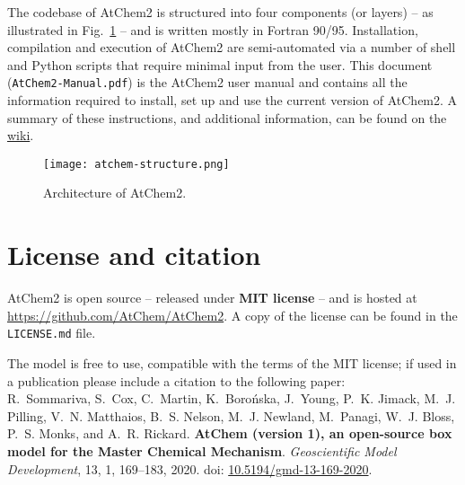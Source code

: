 The codebase of AtChem2 is structured into four components (or layers)
-- as illustrated in Fig.~\ref{fig:atchem-arch} -- and is written
mostly in Fortran 90/95.  Installation, compilation and execution of
AtChem2 are semi-automated via a number of shell and Python scripts
that require minimal input from the user. This document
(\texttt{AtChem2-Manual.pdf}) is the AtChem2 user manual and contains
all the information required to install, set up and use the current
version of AtChem2. A summary of these instructions, and additional
information, can be found on the
\href{https://github.com/AtChem/AtChem2/wiki}{wiki}.

\begin{figure}[htb]
  \centering
  \texttt{[image: atchem-structure.png]}
  \caption{Architecture of AtChem2.}
  \label{fig:atchem-arch}
\end{figure}

\section{License and citation} \label{sec:license-citation}

AtChem2 is open source -- released under \textbf{MIT license} -- and is hosted
at \href{https://github.com/AtChem/AtChem2}{https://github.com/AtChem/AtChem2}.
A copy of the license can be found in the \texttt{LICENSE.md} file.

The model is free to use, compatible with the terms of the MIT
license; if used in a publication please include a citation to
the following paper:\\

R.~Sommariva, S.~Cox, C.~Martin, K.~Boro{\'n}ska, J.~Young, P.~K. Jimack,
M.~J. Pilling, V.~N. Matthaios, B.~S. Nelson, M.~J. Newland, M.~Panagi,
W.~J. Bloss, P.~S. Monks, and A.~R. Rickard.
\textbf{AtChem (version 1), an open-source box model for the Master Chemical Mechanism}.
\textit{Geoscientific Model Development}, 13, 1, 169--183, 2020.
doi: \href{https://doi.org/10.5194/gmd-13-169-2020}{10.5194/gmd-13-169-2020}.
